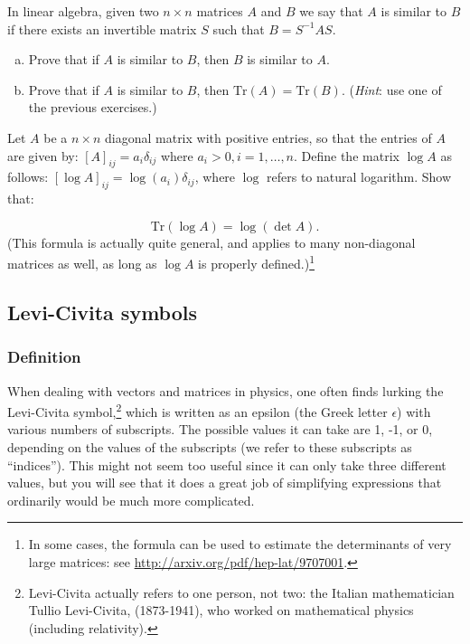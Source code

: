 \begin {exercise}{}
In linear algebra, given two $n \times n$ matrices $A$ and $B$ we say that $A$ is {\bfi similar} to $B$ if there exists an invertible matrix $S$ such that $B = S^{-1}AS$. 
\begin{enumerate}[(a)]
\item
Prove that if $A$ is similar to $B$, then $B$ is similar to $A$.
\item
Prove that if $A$ is similar to $B$, then $\text{Tr} ({A}) = \text{Tr} ({B})$. (\emph{Hint}:  use one of the previous exercises.)
\end{enumerate}
\end{exercise}

\begin {exercise}{}
Let $A$ be a $n \times n$ diagonal matrix with positive entries, so that the entries of $A$ are given by:  $ [A]_{ij} = a_{i} \delta_{ij}$ where $a_i > 0, i = 1, \ldots, n$.  Define the matrix $\log A$ as follows:  $ [\log A]_{ij} = \log(a_{i}) \delta_{ij}$, where $\log$ refers to natural logarithm.  Show that:

\[ \text{Tr}(\log A) = \log (\det A). \]
(This formula is actually quite general, and applies to many non-diagonal matrices as well, as long as $\log A$ is properly defined.)\footnote{In some cases, the formula can be used to estimate the determinants of very large matrices: see \url{http://arxiv.org/pdf/hep-lat/9707001}.} 


\end{exercise}



\subsection{Levi-Civita symbols}
\subsubsection*{Definition}
When dealing with vectors and matrices in physics, one often finds lurking  the Levi-Civita symbol,\footnote{Levi-Civita actually refers to one person, not two: the Italian mathematician Tullio Levi-Civita, (1873-1941), who worked on mathematical physics (including relativity).} which is written as an epsilon (the Greek letter $\epsilon$) with various numbers of subscripts.  The possible values it can take are 1, -1, or 0, depending on the values of the subscripts (we refer to these subscripts as ``indices'').  This might not seem too useful since it can only take three different values, but you will see that it does a great job of simplifying expressions that ordinarily would be much more complicated.  

